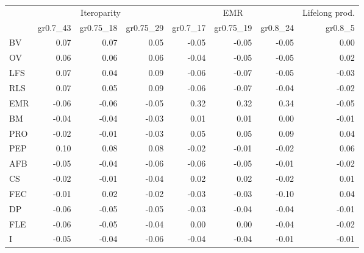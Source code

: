 \begin{landscape}
\begin{table}
\begin{footnotesize}
\begin{tabular}{@{}l|rrr|rrr|r@{}}
\toprule
 & \multicolumn{3}{c|}{Iteroparity} & \multicolumn{3}{c|}{EMR} & \multicolumn{1}{c}{Lifelong prod.}\\
 & gr0.7\_43 & gr0.75\_18 & gr0.75\_29 & gr0.7\_17 & gr0.75\_19 & gr0.8\_24 & gr0.8\_5\\
\midrule
BV & 0.07 & 0.07 & 0.05 & -0.05 & -0.05 & -0.05 & 0.00\\
OV & 0.06 & 0.06 & 0.06 & -0.04 & -0.05 & -0.05 & 0.02\\
LFS & 0.07 & 0.04 & 0.09 & -0.06 & -0.07 & -0.05 & -0.03\\
RLS & 0.07 & 0.05 & 0.09 & -0.06 & -0.07 & -0.04 & -0.02\\
EMR & -0.06 & -0.06 & -0.05 & 0.32 & 0.32 & 0.34 & -0.05\\
BM & -0.04 & -0.04 & -0.03 & 0.01 & 0.01 & 0.00 & -0.01\\
PRO & -0.02 & -0.01 & -0.03 & 0.05 & 0.05 & 0.09 & 0.04\\
PEP & 0.10 & 0.08 & 0.08 & -0.02 & -0.01 & -0.02 & 0.06\\
AFB & -0.05 & -0.04 & -0.06 & -0.06 & -0.05 & -0.01 & -0.02\\
CS & -0.02 & -0.01 & -0.04 & 0.02 & 0.02 & -0.02 & 0.01\\
FEC & -0.01 & 0.02 & -0.02 & -0.03 & -0.03 & -0.10 & 0.04\\
DP & -0.06 & -0.05 & -0.05 & -0.03 & -0.04 & -0.04 & -0.01\\
FLE & -0.06 & -0.05 & -0.04 & 0.00 & 0.00 & -0.04 & -0.02\\
I & -0.05 & -0.04 & -0.06 & -0.04 & -0.04 & -0.01 & -0.01\\
\bottomrule
\end{tabular}
\end{footnotesize}
\end{table}

\end{landscape}


